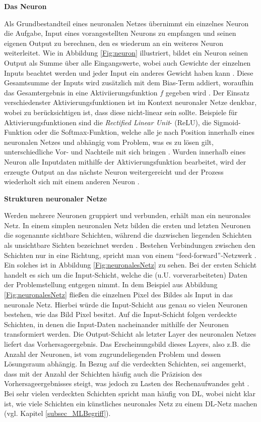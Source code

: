\textbf{Das Neuron}

Als Grundbestandteil eines neuronalen Netzes übernimmt ein einzelnes Neuron die Aufgabe, Input eines vorangestellten Neurons zu empfangen und seinen eigenen Output zu berechnen, den es wiederum an ein weiteres Neuron weiterleitet. Wie in Abbildung \ref{Fig:neuron} illustriert, bildet ein Neuron seinen Output als Summe über alle Eingangswerte, wobei auch Gewichte der einzelnen Inputs beachtet werden und jeder Input ein anderes Gewicht haben kann \cite{Ertel.2021}. Diese Gesamtsumme der Inputs wird zusätzlich mit dem Bias-Term addiert, woraufhin das Gesamtergebnis in eine Aktiviierungsfunktion $f$ gegeben wird \cite{Ertel.2021, Verdhan.2020}. Der Einsatz verschiedenster Aktivierungsfunktionen ist im Kontext neuronaler Netze denkbar, wobei zu berücksichtigen ist, dass diese nicht-linear sein sollte. Beispiele für Aktivierungsfunktionen sind die \emph{Rectified Linear Unit}- (ReLU), die Sigmoid-Funktion oder die Softmax-Funktion, welche alle je nach Position innerhalb eines neuronalen Netzes und abhängig vom Problem, was es zu lösen gilt, unterschiedliche Vor- und Nachteile mit sich bringen \cite{Choo.2020}. Wurden innerhalb eines Neuron alle Inputdaten mithilfe der Aktivierungsfunktion bearbeitet, wird der erzeugte Output an das nächste Neuron weitergereicht und der Prozess wiederholt sich mit einem anderen Neuron \cite{Ertel.2021}.

\textbf{Strukturen neuronaler Netze}

Werden mehrere Neuronen gruppiert und verbunden, erhält man ein neuronales Netz. In einem simplen neuronalen Netz bilden die ersten und letzten Neuronen die sogenannte sichtbare Schichten, während die dazwischen liegenden Schichten als unsichtbare Sichten bezeichnet werden \cite{Choo.2020}. Bestehen Verbindungen zwischen den Schichten nur in eine Richtung, spricht man von einem \enquote{feed-forward}-Netzwerk \cite{Ertel.2021}. Ein solches ist in Abbildung \ref{Fig:neuronalesNetz} zu sehen. Bei der ersten Schicht handelt es sich um die Input-Schicht, welche die (u.U. vorverarbeiteten) Daten der Problemstellung entgegen nimmt. In dem Beispiel aus Abbildung \ref{Fig:neuronalesNetz} fließen die einzelnen Pixel des Bildes als Input in das neuronale Netz. Hierbei würde die Input-Schicht aus genau so vielen Neuronen bestehen, wie das Bild Pixel besitzt. Auf die Input-Schicht folgen verdeckte Schichten, in denen die Input-Daten nacheinander mithilfe der Neuronen transformiert werden. Die Output-Schicht als letzter Layer des neuronalen Netzes liefert das Vorhersageergebnis. Das Erscheinungsbild dieses Layers, also z.B. die Anzahl der Neuronen, ist vom zugrundeliegenden Problem und dessen Lösungsraum abhängig. In Bezug auf die verdeckten Schichten, sei angemerkt, dass mit der Anzahl der Schichten häufig auch die Präzision des Vorhersageergebnisses steigt, was jedoch zu Lasten des Rechenaufwandes geht \cite{Ng.2018}. Bei sehr vielen verdeckten Schichten spricht man häufig von DL, wobei nicht klar ist, wie viele Schichten ein künstliches neuronales Netz zu einem DL-Netz machen (vgl. Kapitel \ref{subsec_MLBegriff}). 

